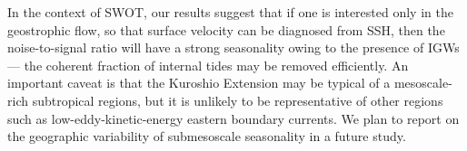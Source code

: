 \documentclass[grl]{agutex2015}
\begin{document}
\begin{article}
In the context of SWOT, our results suggest that if one is interested
only in the geostrophic flow, so that surface velocity can be diagnosed
from SSH, then the noise-to-signal ratio will have a strong seasonality owing
to the presence of IGWs --- the coherent fraction of internal tides may be removed
efficiently.
An important caveat is that the Kuroshio Extension may be typical of a mesoscale-rich
subtropical regions, but it is unlikely to be
representative of other regions such as low-eddy-kinetic-energy eastern boundary
currents.  We plan to report on the geographic variability of submesoscale
seasonality in a future study.






%
%
%




\end{article}
\end{document}

